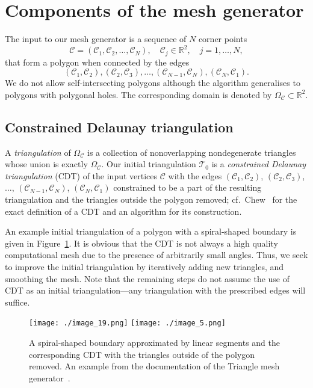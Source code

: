 \documentclass[11pt]{article}
\begin{document}
\section{Components of the mesh generator}
\label{sec:components}

The input to
our mesh generator is a sequence of \(N\) corner points
$$\mathcal{C} = (\mathcal{C}_1, \mathcal{C}_2, \dots, \mathcal{C}_N), \quad \mathcal{C}_j \in \mathbb{R}^2, \quad j = 1,\dots,N,$$
that form a polygon when connected by the edges
$$(\mathcal{C}_1, \mathcal{C}_2), (\mathcal{C}_2,\mathcal{C}_3),
\dots, (\mathcal{C}_{N-1}, \mathcal{C}_N), (\mathcal{C}_N,\mathcal{C}_1).$$
We do not allow self-intersecting polygons although
the algorithm generalises to polygons
with polygonal holes.
The corresponding domain is denoted
by \(\Omega_{\mathcal{C}} \subset \mathbb{R}^2\).

\subsection{Constrained Delaunay triangulation}
\label{sec:cdt}

A \emph{triangulation} of \(\Omega_{\mathcal{C}}\) is a
collection of nonoverlapping nondegenerate triangles whose union is exactly
\(\Omega_{\mathcal{C}}\).  Our initial triangulation \(\mathcal{T}_0\) is a
\emph{constrained Delaunay triangulation} (CDT) of the input vertices
\(\mathcal{C}\) with the edges \((\mathcal{C}_1, \mathcal{C}_2)\),
\((\mathcal{C}_2,\mathcal{C}_3)\), \(\dots\), \((\mathcal{C}_{N-1},
\mathcal{C}_N)\), \((\mathcal{C}_N, \mathcal{C}_1)\) constrained to be a part of
the resulting triangulation and the triangles outside the polygon removed;
cf.~Chew~\cite{Chew_1987} for the exact definition of a CDT and an algorithm for
its construction.

An example initial triangulation of a polygon with a spiral-shaped boundary is
given in Figure~\ref{fig:cdt}. It is obvious that the CDT is not always a high
quality computational mesh due to the presence of arbitrarily small angles.
Thus, we seek to improve the initial triangulation by iteratively adding new
triangles, and smoothing the mesh.  Note that the remaining steps do not assume
the use of CDT as an initial triangulation---any triangulation with the
prescribed edges will suffice.

\begin{figure}[htbp]
  \centering
  \texttt{[image: ./image\_19.png]}
  \texttt{[image: ./image\_5.png]}
\caption{A spiral-shaped boundary approximated by linear segments and the
  corresponding CDT with the triangles outside of the polygon removed.  An
  example from the documentation of the Triangle mesh
  generator~\cite{shewchuk1996triangle}.}
\label{fig:cdt}
\end{figure}
\end{document}
